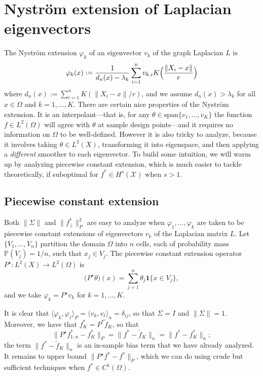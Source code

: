 \documentclass{article}
\newcommand{\1}{\mathbf{1}}
\newcommand{\Leb}{L}
\newcommand{\mc}[1]{\mathcal{#1}}
\newcommand{\Pbb}{\mathbb{P}}
\newcommand{\dotp}[2]{\langle #1, #2 \rangle}
\newcommand{\wt}[1]{\widetilde{#1}}
\theoremstyle{definition}
\theoremstyle{remark}
\begin{document}
\section{Nystr\"{o}m extension of Laplacian eigenvectors}
The Nystr\"{o}m extension $\varphi_k$ of an eigenvector $v_k$ of the graph Laplacian $L$ is
\begin{equation}
\label{eqn:nystrom}
\varphi_k(x) := \frac{1}{d_n(x) - \lambda_k} \sum_{i = 1}^{n} v_{k,i} K\Bigl(\frac{\|X_i - x\|}{r}\Bigr)
\end{equation}
where $d_n(x) := \sum_{i = 1}^{n} K(\|X_i - x\|/r)$, and we assume $d_n(x) > \lambda_k$ for all $x \in \Omega$ and $k = 1,\ldots,K$. There are certain nice properties of the Nystr\"{o}m extension. It is an interpolant---that is, for any $\theta \in \mathrm{span}\{v_1,\ldots,v_K\}$ the function $f \in \Leb^2(\Omega)$ will agree with $\theta$ at sample design points---and it requires no information on $\Omega$ to be well-defined. However it is also tricky to analyze, because it involves taking $\theta \in \Leb^2(X)$, transforming it into eigenspace, and then applying a \emph{different} smoother to each eigenvector. To build some intuition, we will warm up by analyzing piecewise constant extension, which is much easier to tackle theoretically, if suboptimal for $f^{\ast} \in H^s(\mc{X})$ when $s > 1$.

\subsection{Piecewise constant extension}
Both $\|\Sigma\|$ and $\|f_{\perp}^{\ast}\|_P^2$ are easy to analyze when $\varphi_1,\ldots,\varphi_k$ are taken to be piecewise constant extensions of eigenvectors $v_k$ of the Laplacian matrix $L$.
Let $\{V_1,\ldots,V_n\}$ partition the domain $\Omega$ into $n$ cells, each of probability mass $\Pbb(V_j) = 1/n$, such that $x_j \in V_j$. The piecewise constant extension operator $P^{\star}: L^2(X)\to L^2(\Omega)$ is
\begin{equation}
\label{eqn:piecewise_extension}
\bigl(P^{\star}\theta\bigr)(x) = \sum_{j = 1}^{n} \theta_j \1\{x \in V_j\},
\end{equation}
and we take $\varphi_k = P^{\star}v_k$ for $k = 1,\ldots,K$.

It is clear that $\dotp{{\varphi}_k}{{\varphi}_{\ell}}_{P} = \dotp{v_k}{v_{\ell}}_{n} = \delta_{ij}$, so that $\Sigma = I$ and $\|\Sigma\| = 1$. Moreover, we have that $f_K^{\ast} = P^{\ast}\wt{f}_K$, so that
\begin{equation*}
\|P^{\star}f_{1:n}^{\ast} - {f}_K^{\ast}\|_P = \|f^{\ast} - \wt{f}_K\|_n = \|f^{\ast} - f_K^{\ast}\|_n;
\end{equation*}
the term $\|f^{\ast} - \wt{f}_K\|_n$ is an in-sample bias term that we have already analyzed. It remains to upper bound $\|P^{\star}f^{\ast} - f^{\ast}\|_P$, which we can do using crude but sufficient techniques when $f^{\ast} \in C^1(\Omega)$. 
\end{document}
